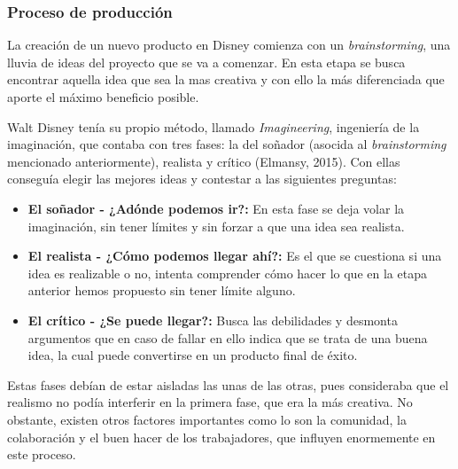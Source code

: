 \subsubsection{Proceso de producción}
La creación de un nuevo producto en Disney comienza con un \textit{brainstorming}, una lluvia de ideas del proyecto que se va a comenzar. En esta etapa se busca encontrar aquella idea que sea la mas creativa y con ello la más diferenciada que aporte el máximo beneficio posible.

Walt Disney tenía su propio método, llamado \textit{Imagineering}, ingeniería de la imaginación, que contaba con tres fases: la del soñador (asocida al \textit{brainstorming} mencionado anteriormente), realista y crítico (Elmansy, 2015). Con ellas conseguía elegir las mejores ideas y contestar a las siguientes preguntas:

\begin{itemize}

\item
\textbf{El soñador - ¿Adónde podemos ir?:} En esta fase se deja volar la imaginación, sin tener límites y sin forzar a que una idea sea realista.

\item
\textbf{El realista - ¿Cómo podemos llegar ahí?:} Es el que se cuestiona si una idea es realizable o no, intenta comprender cómo hacer lo que en la etapa anterior hemos propuesto sin tener límite alguno.

\item
\textbf{El crítico - ¿Se puede llegar?:} Busca las debilidades y desmonta argumentos que en caso de fallar en ello indica que se trata de una buena idea, la cual puede convertirse en un producto final de éxito.

\end{itemize}

Estas fases debían de estar aisladas las unas de las otras, pues consideraba que el realismo no podía interferir en la primera fase, que era la más creativa. No obstante, existen otros factores importantes como lo son la comunidad, la colaboración y el buen hacer de los trabajadores, que influyen enormemente en este proceso.

